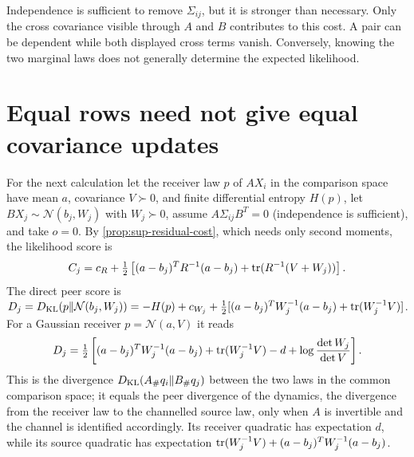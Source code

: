 Independence is sufficient to remove $\Sigma_{ij}$, but it is stronger than necessary. Only the cross covariance visible through $A$ and $B$ contributes to this cost. A pair can be dependent while both displayed cross terms vanish. Conversely, knowing the two marginal laws does not generally determine the expected likelihood.

\section{Equal rows need not give equal covariance updates}

For the next calculation let the receiver law $p$ of $AX_i$ in the comparison space have mean $a$, covariance $V\succ0$, and finite differential entropy $H(p)$, let $BX_j\sim\mathcal N(b_j,W_j)$ with $W_j\succ0$, assume $A\Sigma_{ij}B^T=0$ (independence is sufficient), and take $o=0$. By \cref{prop:sup-residual-cost}, which needs only second moments, the likelihood score is
\begin{equation}
 C_j=c_R+\tfrac12\left[(a-b_j)^TR^{-1}(a-b_j)
                  +\operatorname{tr}(R^{-1}(V+W_j))\right].
 \label{eq:sup-nll-score}
\end{equation}
The direct peer score is $D_j=D_{\mathrm{KL}}(p\Vert\mathcal N(b_j,W_j))=-H(p)+c_{W_j}+\tfrac12[(a-b_j)^TW_j^{-1}(a-b_j)+\operatorname{tr}(W_j^{-1}V)]$. For a Gaussian receiver $p=\mathcal N(a,V)$ it reads
\begin{equation}
 D_j=\tfrac12\left[(a-b_j)^TW_j^{-1}(a-b_j)
            +\operatorname{tr}(W_j^{-1}V)-d+\log\frac{\det W_j}{\det V}\right].
 \label{eq:sup-peer-score}
\end{equation}
This is the divergence $D_{\mathrm{KL}}(A_\#q_i\Vert B_\#q_j)$ between the two laws in the common comparison space; it equals the peer divergence of the dynamics, the divergence from the receiver law to the channelled source law, only when $A$ is invertible and the channel is identified accordingly. Its receiver quadratic has expectation $d$, while its source quadratic has expectation $\operatorname{tr}(W_j^{-1}V)+(a-b_j)^TW_j^{-1}(a-b_j)$.

